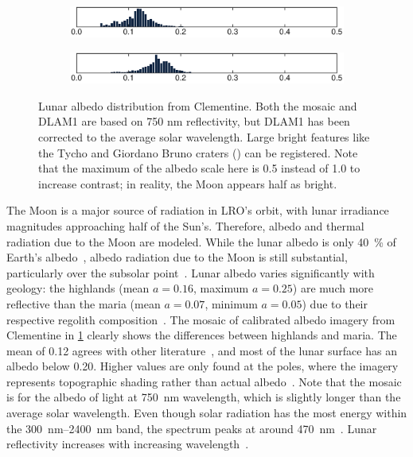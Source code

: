 \begin{figure}[t]
    \begin{subfigure}[c]{0.49\textwidth}
        \includegraphics[width=\textwidth]{figures/plots/lunar_hist_photo.pdf}
        \label{fig:lunar-albedo-map-photo}
    \end{subfigure}
   \hfill
    \begin{subfigure}[c]{0.49\textwidth}
        \includegraphics[width=\textwidth]{figures/plots/lunar_hist_dlam1.pdf}
        \label{fig:lunar-albedo-map-dlam1}
    \end{subfigure}

   \caption{Lunar albedo distribution from Clementine. Both the mosaic and \acrshort{DLAM1} are based on 750 nm reflectivity, but \acrshort{DLAM1} has been corrected to the average solar wavelength. Large bright features like the Tycho and Giordano Bruno craters (\textcolor{mpl-pink}{}) can be registered. Note that the maximum of the albedo scale here is 0.5 instead of 1.0 to increase contrast; in reality, the Moon appears half as bright.}
   \label{fig:lunar-albedo-map}
\end{figure}

The Moon is a major source of radiation in \gls{LRO}'s orbit, with lunar irradiance magnitudes approaching half of the Sun's. Therefore, albedo and thermal radiation due to the Moon are modeled. While the lunar albedo is only \qty{40}{\percent} of Earth's albedo~\cite{Goode2001}, albedo radiation due to the Moon is still substantial, particularly over the subsolar point~\cite{Floberghagen1999}. Lunar albedo varies significantly with geology: the highlands (mean $a = 0.16$, maximum $a=0.25$) are much more reflective than the maria (mean $a = 0.07$, minimum $a = 0.05$) due to their respective regolith composition~\cite{Vasavada2012,Hayne2017,Sato2014}. The mosaic of calibrated albedo imagery from Clementine in \cref{fig:lunar-albedo-map-photo} clearly shows the differences between highlands and maria. The mean of 0.12 agrees with other literature~\cite{Vasavada2012}, and most of the lunar surface has an albedo below 0.20. Higher values are only found at the poles, where the imagery represents topographic shading rather than actual albedo~\cite{McEwen1997}. Note that the mosaic is for the albedo of light at \qty{750}{\nm} wavelength, which is slightly longer than the average solar wavelength. Even though solar radiation has the most energy within the \qtyrange{300}{2400}{\nm} band, the spectrum peaks at around \qty{470}{\nm}~\cite{Iqbal1983}. Lunar reflectivity increases with increasing wavelength~\cite{Shkuratov2011}.

